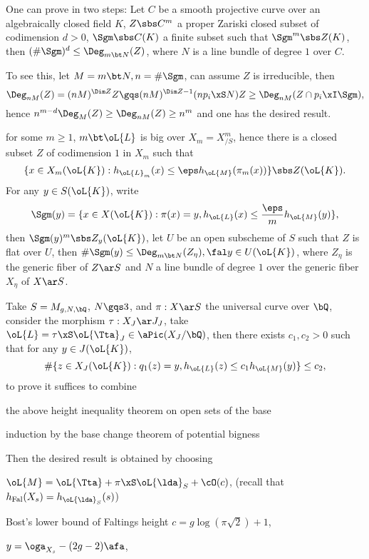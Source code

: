 \documentclass[article, a4paper, twoside]{universal}
\begin{document}
\begin{prf}
	One can prove in two steps:
	 Let $C$ be a smooth projective curve over an algebraically closed field $K$, $Z\sbs C^{m}$ a proper Zariski closed subset of codimension $d>0$, $\Sgm\sbs C(K)$ a finite subset such that $\Sgm^{m}\sbs Z(K)$, then $(\#\Sgm)^{d}\leq\Deg_{m\bt N}(Z)$, where $N$ is a line bundle of degree $1$ over $C$.

	To see this, let $M=m\bt N, n=\#\Sgm$, can assume $Z$ is irreducible, then
	\[
		\Deg_{nM}(Z)=(nM)^{\Dim Z}Z\gqs(nM)^{\Dim Z-1}(np_{i}\xS N)Z\geq\Deg_{nM}(Z\cap p_{i}\xI\Sgm),
	\]
	hence $n^{m-d}\Deg_{M}(Z)\geq\Deg_{nM}(Z)\geq n^{m}$ and one has the desired result.

	 for some $m\geq1$, $m\bt\oL{L}$ is big over $X_{m}=X_{/S}^{m}$, hence there is a closed subset $Z$ of codimension $1$ in $X_{m}$ such that
	\[
		\{x\in X_{m}(\oL{K}):h_{\oL{L}_{m}}(x)\leq\eps h_{\oL{M}}(\pi_{m}(x))\}\sbs Z(\oL{K}).
	\]
	For any $y\in S(\oL{K})$, write
	\[
		\Sgm(y)=\{x\in X(\oL{K}):\pi(x)=y,h_{\oL{L}}(x)\leq\frac{\eps}{m}h_{\oL{M}}(y)\},
	\]
	then $\Sgm(y)^{m}\sbs Z_{y}(\oL{K})$, let $U$ be an open subscheme of $S$ such that $Z$ is flat over $U$, then $\#\Sgm(y)\leq\Deg_{m\bt N}(Z_{\eta}),\fal y\in U(\oL{K})$, where $Z_{\eta}$ is the generic fiber of $Z\ar S$ and $N$ a line bundle of degree $1$ over the generic fiber $X_{\eta}$ of $X\ar S$.
\end{prf}


Take $S=M_{g,N,\bQ}$, $N\gqs3$, and $\pi:X\ar S$ the universal curve over $\bQ$, consider the morphism $\tau:X_{J}\ar J_{J}$, take $\oL{L}=\tau\xS\oL{\Tta}_{J}\in\aPic(X_{J}/\bQ)$, then there exists $c_{1},c_{2}>0$ such that for any $y\in J(\oL{K})$,
\[
	\#\{z\in X_{J}(\oL{K}):q_{1}(z)=y, h_{\oL{L}}(z)\leq c_{1}h_{\oL{M}}(y)\}\leq c_{2},
\]
to prove it suffices to combine
\begin{enr}
	\item the above height inequality theorem on open sets of the base
	\item induction by the base change theorem of potential bigness
\end{enr}
Then the desired result is obtained by choosing
\begin{enr}
	\item $\oL{M}=\oL{\Tta}+\pi\xS\oL{\lda}_{S}+\cO(c)$, (recall that $h_{\mathrm{Fal}}(X_{s})=h_{\oL{\lda}_{S}}(s)$)
	\item Bost's lower bound of Faltings height $c=g\log(\pi\sqrt{2})+1$,
	\item $y=\oga_{X_{s}}-(2g-2)\afa$,
\end{enr}
\end{document}
